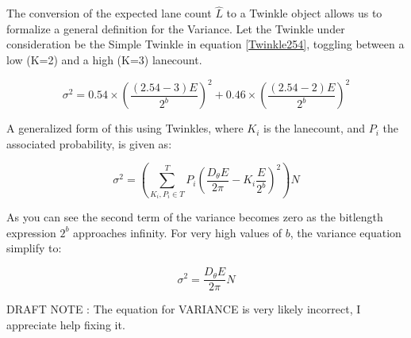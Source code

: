 \documentclass[notitlepage]{article}
\begin{document}
The conversion of the expected lane count $\hat{L}$ to a Twinkle object allows us to formalize a general definition for the Variance. Let the Twinkle under consideration be the Simple Twinkle in equation \eqref{Twinkle254}, toggling between a low (K=2) and a high (K=3) lanecount. 


\begin{equation}
	\sigma^2 = 0.54 \times (\frac{(2.54 - 3)E}{2^b})^2 + 0.46 \times (\frac{(2.54 - 2)E}{2^b})^2
	\label{eq:Twinkle254Variance}
\end{equation}

A generalized form of this using Twinkles, where $K_i$ is the lanecount, and $P_i$ the associated probability, is given as:

\begin{equation}
	\sigma^2 =  \left( \sum^T_{K_i, P_i \in T}  P_i (\frac{D_\theta E }{2\pi} - K_i \frac{E}{2^b})^2\right)N
	\label{eq:deviancefrommean}
\end{equation}

As you can see the second term of the variance becomes zero as the bitlength expression $2^b$ approaches infinity. For very high values of $b$, the variance equation simplify to:

\begin{equation}
	\sigma^2 =  \frac{D_\theta E }{2\pi} N
	\label{eq:deviancefrommeansimplified}
\end{equation}

DRAFT NOTE : The equation for VARIANCE is very likely incorrect, I appreciate help fixing it.
\end{document}
